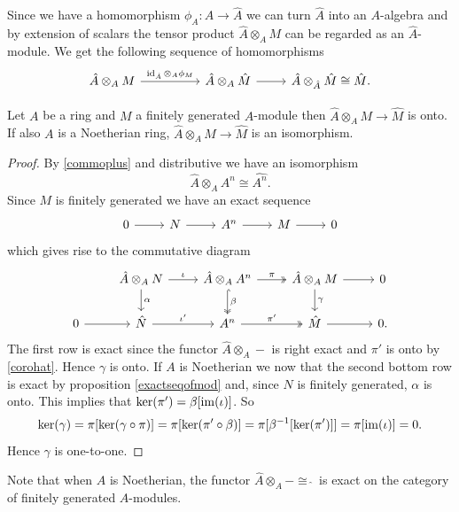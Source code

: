 Since we have a homomorphism $\phi_A\colon A\to\hat A$ we can turn $\hat A$ into an $A$-algebra and by extension of scalars the tensor product $\hat A\otimes_A M$ can be regarded as an $\hat A$-module. We get the following sequence of homomorphisms
\[
\begin{tikzcd}
    \hat A\otimes_A M\ar[rr, "\id_{\hat A} \otimes_A \phi_M"] &&\hat A\otimes_A \hat M\rar & \hat A\otimes_{\hat A} \hat M\cong \hat M. 
\end{tikzcd}
\]
\begin{prop}\label{tensor}
    Let $A$ be a ring and $M$ a finitely generated $A$-module then $\hat A\otimes_A M\to \hat M$ is onto. If also $A$ is a Noetherian ring, $\hat A\otimes_A M\to \hat M$ is an isomorphism.
\end{prop}
\begin{proof}
    By \eqref{commoplus} and distributive we have an isomorphism 
    \[
    \hat A\otimes_A A^n\cong \widehat{A^n}.
    \]
    Since $M$ is finitely generated we have an exact sequence
    \[
    \begin{tikzcd}
        0 \rar & N \rar & A^n \rar & M \rar &0
    \end{tikzcd}
    \]
    which gives rise to the commutative diagram
    \[
    \begin{tikzcd}
        & \hat A\otimes_A N \ar[r, "\iota"] \ar[d, "\alpha"] & \hat A\otimes_A A^n \ar[r, "\pi", two heads] \ar[d, "\beta", hook, two heads] & \hat A\otimes_A M \ar[r] \ar[d, "\gamma"] & 0 \\
        0 \rar & \hat N \ar[r, "\iota'"] & A^n \ar[r, "\pi'", two heads] & \hat M\rar & 0.
    \end{tikzcd}
    \]
    The first row is exact since the functor $\hat A\otimes_A-$ is right exact and $\pi'$ is onto by \ref{corohat}. Hence $\gamma$ is onto. If $A$ is Noetherian we now that the second bottom row is exact by proposition \ref{exactseqofmod} and, since $N$ is finitely generated, $\alpha$ is onto. This implies that $\ker(\pi')=\beta[\operatorname{im}(\iota)]$. So 
    \begin{align*}
        \ker(\gamma)= \pi[\ker(\gamma\circ\pi)]=\pi[\ker(\pi'\circ \beta)]=\pi[\beta^{-1}[\ker(\pi')]]=\pi[\operatorname{im}(\iota)]=0.
    \end{align*}
    Hence $\gamma$ is one-to-one.
\end{proof}

Note that when $A$ is Noetherian, the functor $\hat A\otimes_A-\cong \,\hat{}\,$ is exact on the category of finitely generated $A$-modules.

